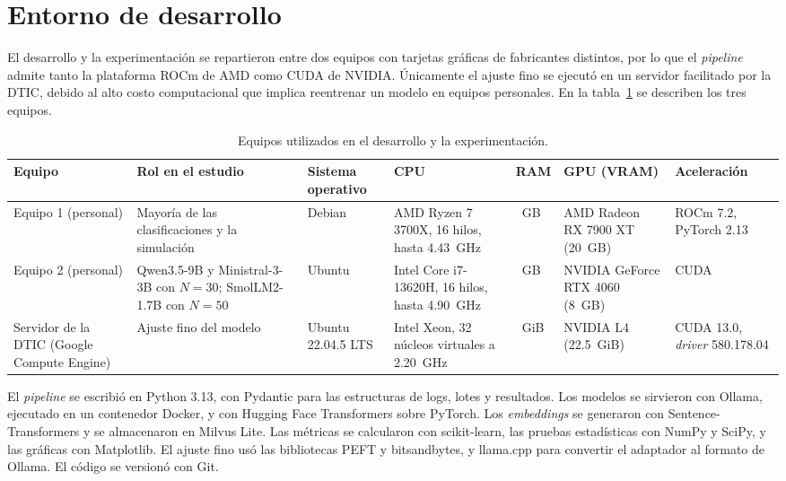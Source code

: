 \section{Entorno de desarrollo}\label{subsec:met_entorno}

El desarrollo y la experimentación se repartieron entre dos equipos con tarjetas gráficas de fabricantes distintos, por lo que el \textit{pipeline} admite tanto la plataforma ROCm de AMD como CUDA de NVIDIA. Únicamente el ajuste fino se ejecutó en un servidor facilitado por la DTIC, debido al alto costo computacional que implica reentrenar un modelo en equipos personales. En la tabla~\ref{tab:met_equipos} se describen los tres equipos.

\begin{table}[H]
\centering
\caption{Equipos utilizados en el desarrollo y la experimentación.}
\label{tab:met_equipos}
\footnotesize\linespread{1}\selectfont
\setlength{\tabcolsep}{4pt}
\begin{tabularx}{\textwidth}{@{}>{\raggedright\arraybackslash}p{2.1cm}>{\raggedright\arraybackslash}X>{\raggedright\arraybackslash}p{1.6cm}>{\raggedright\arraybackslash}X>{\raggedright\arraybackslash}p{1.4cm}>{\raggedright\arraybackslash}X>{\raggedright\arraybackslash}p{1.9cm}@{}}
\toprule
\textbf{Equipo} & \textbf{Rol en el estudio} & \textbf{Sistema operativo} & \textbf{CPU} & \textbf{RAM} & \textbf{GPU (VRAM)} & \textbf{Aceleración} \\
\midrule
Equipo 1 (personal) & Mayoría de las clasificaciones y la simulación & Debian & AMD Ryzen 7 3700X, 16 hilos, hasta 4.43~GHz & 24~GB & AMD Radeon RX 7900 XT (20~GB) & ROCm 7.2, PyTorch 2.13 \\
\addlinespace
Equipo 2 (personal) & Qwen3.5-9B y Ministral-3-3B con $N=30$; SmolLM2-1.7B con $N=50$ & Ubuntu & Intel Core i7-13620H, 16 hilos, hasta 4.90~GHz & 16~GB & NVIDIA GeForce RTX 4060 (8~GB) & CUDA \\
\addlinespace
Servidor de la DTIC (Google Compute Engine) & Ajuste fino del modelo & Ubuntu 22.04.5 LTS & Intel Xeon, 32 núcleos virtuales a 2.20~GHz & 125.8~GiB & NVIDIA L4 (22.5~GiB) & CUDA 13.0, \textit{driver} 580.178.04 \\
\bottomrule
\end{tabularx}
\normalsize
\end{table}

El \textit{pipeline} se escribió en Python 3.13, con Pydantic para las estructuras de logs, lotes y resultados. Los modelos se sirvieron con Ollama, ejecutado en un contenedor Docker, y con Hugging Face Transformers sobre PyTorch. Los \textit{embeddings} se generaron con Sentence-Transformers y se almacenaron en Milvus Lite. Las métricas se calcularon con scikit-learn, las pruebas estadísticas con NumPy y SciPy, y las gráficas con Matplotlib. El ajuste fino usó las bibliotecas PEFT y bitsandbytes, y llama.cpp para convertir el adaptador al formato de Ollama. El código se versionó con Git.


